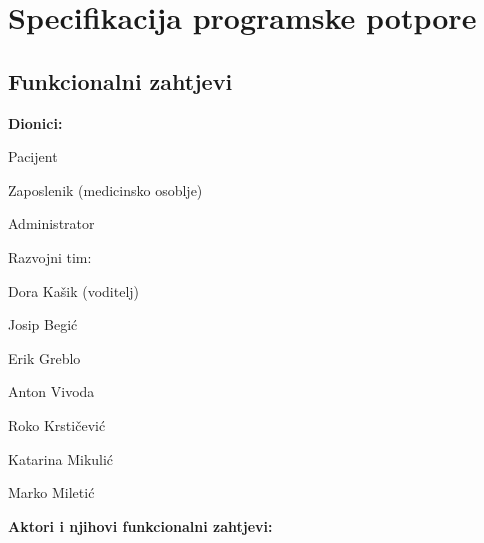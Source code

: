 \chapter{Specifikacija programske potpore}

\section{Funkcionalni zahtjevi}


\noindent \textbf{Dionici:}

\begin{packed_enum}
	
	\item Pacijent
	\item Zaposlenik (medicinsko osoblje)				
	\item Administrator
	\item Razvojni tim:
	\begin{packed_item}
		\item Dora Kašik (voditelj)
		\item Josip Begić
		\item Erik Greblo
		\item Anton Vivoda
		\item Roko Krstičević
		\item Katarina Mikulić
		\item Marko Miletić
	\end{packed_item}
	
\end{packed_enum}

\noindent \textbf{Aktori i njihovi funkcionalni zahtjevi:}


